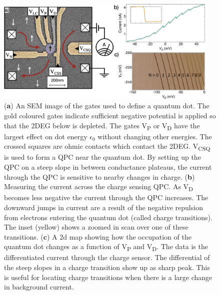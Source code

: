 \begin{figure}[!htb]
  \begin{center}
    \includegraphics[width=0.95\textwidth]{figures/ch1/crop_FiguresMaster.006.png}
    \caption[Charge sensing a quantum dot]{\label{fig:ch1/ct_intro} 
    (\textbf{a}) An SEM image of the gates used to define a quantum dot. The gold coloured gates indicate sufficient negative potential is applied so that the 2DEG below is depleted. The gates V\textsubscript{P} or V\textsubscript{D} have the largest effect on dot energy $\epsilon_0$ without changing other energies. The crossed squares are ohmic contacts which contact the 2DEG. V\textsubscript{CSQ} is used to form a QPC near the quantum dot. By setting up the QPC on a steep slope in between conductance plateaus, the current through the QPC is sensitive to nearby changes in charge. (\textbf{b}) Measuring the current across the charge sensing QPC. As V\textsubscript{D} becomes less negative the current through the QPC increases. The downward jumps in current are a result of the negative repulsion from electrons entering the quantum dot (called charge transitions). The inset (yellow) shows a zoomed in scan over one of these transitions. (\textbf{c}) A 2d map showing how the occupation of the quantum dot changes as a function of V\textsubscript{P} and V\textsubscript{D}. The data is the differentiated current through the charge sensor. The differential of the steep slopes in a charge transition show up as sharp peak. This is useful for locating charge transitions when there is a large change in background current. 
      }
  \end{center}
\end{figure}


